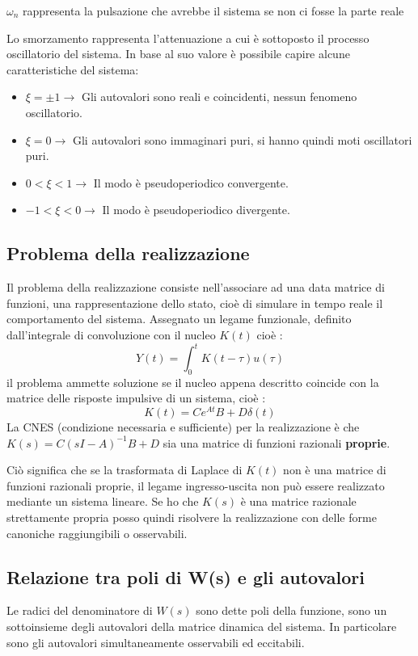 \documentclass{article}
\begin{document}
$\omega_n$ rappresenta la pulsazione che avrebbe il sistema se non ci fosse la parte reale

Lo smorzamento rappresenta l'attenuazione a cui è sottoposto il processo oscillatorio del sistema.
In base al suo valore è possibile capire alcune caratteristiche del sistema:
\begin{itemize}
    \item $\xi = \pm 1 \to $ Gli autovalori sono reali e coincidenti, nessun fenomeno oscillatorio.
    \item $\xi = 0 \to$ Gli autovalori sono immaginari puri, si hanno quindi moti oscillatori puri.
    \item $0<\xi<1 \to$ Il modo è pseudoperiodico convergente.
    \item $-1<\xi<0 \to$ Il modo è  pseudoperiodico divergente.
\end{itemize}


\subsection{Problema della realizzazione}
Il problema della realizzazione consiste nell'associare ad una data matrice di funzioni,
una rappresentazione dello stato, cioè di simulare in tempo reale il comportamento del sistema.
Assegnato un legame funzionale, definito dall'integrale di convoluzione con il nucleo $K(t)$ cioè :
\[ Y(t)=\int_{0}^{t}K(t-\tau)u(\tau) \]
il problema ammette soluzione se il nucleo appena descritto coincide con la matrice delle risposte impulsive di un sistema, cioè :
\[ K(t)=Ce^{At}B+D\delta(t) \]
La CNES (condizione necessaria e sufficiente) per la realizzazione è che $K(s)=C(sI-A)^{-1}B+D$ sia una matrice di funzioni razionali \textbf{proprie}.

Ciò significa che se la trasformata di Laplace di $K(t)$ non è una matrice di funzioni razionali proprie,
il legame ingresso-uscita non può essere realizzato mediante un sistema lineare.
Se ho che $K(s)$ è una matrice razionale strettamente propria posso quindi risolvere la realizzazione con delle forme canoniche raggiungibili o osservabili.


\subsection{Relazione tra poli di W(s) e gli autovalori}

Le radici del denominatore di $W(s)$ sono dette poli della funzione, sono un sottoinsieme degli autovalori della matrice dinamica del sistema.
In particolare sono gli autovalori simultaneamente osservabili ed eccitabili.
\end{document}

